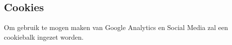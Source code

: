 \subsection{Cookies}\label{cookies}

Om gebruik te mogen maken van Google Analytics en Social Media zal een cookiebalk ingezet worden.
